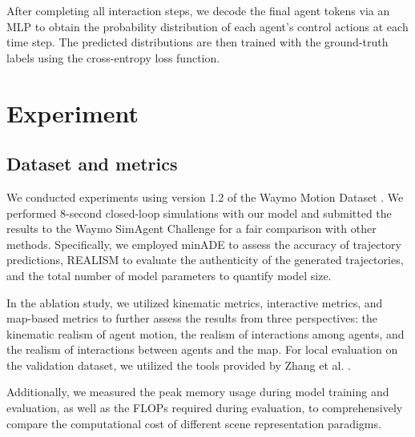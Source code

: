 \documentclass[lettersize,journal]{IEEEtran}
\theoremstyle{definition}
\begin{document}
After completing all interaction steps, we decode the final agent tokens via an MLP to obtain the probability distribution of each agent's control actions at each time step. The predicted distributions are then trained with the ground-truth labels using the cross-entropy loss function.

\section{Experiment}

\subsection{Dataset and metrics}
We conducted experiments using version 1.2 of the Waymo Motion Dataset \cite{sun2020scalability}. We performed 8-second closed-loop simulations with our model and submitted the results to the Waymo SimAgent Challenge for a fair comparison with other methods. Specifically, we employed minADE to assess the accuracy of trajectory predictions, REALISM to evaluate the authenticity of the generated trajectories, and the total number of model parameters to quantify model size.

In the ablation study, we utilized kinematic metrics, interactive metrics, and map-based metrics to further assess the results from three perspectives: the kinematic realism of agent motion, the realism of interactions among agents, and the realism of interactions between agents and the map. For local evaluation on the validation dataset, we utilized the tools provided by Zhang et al. \cite{zhang2025closed}.

Additionally, we measured the peak memory usage during model training and evaluation, as well as the FLOPs required during evaluation, to comprehensively compare the computational cost of different scene representation paradigms.
\end{document}

